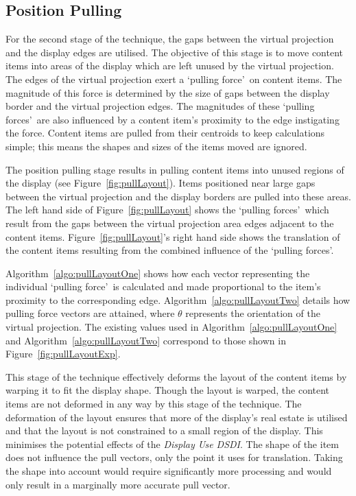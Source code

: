 \documentclass{bmcart}
\begin{document}
\subsection*{Position Pulling}
\label{subsec:positionpulling} 


For the second stage of the technique, the gaps between the virtual projection and the display edges are utilised.
The objective of this stage is to move content items into areas of the display which are left unused by the virtual projection.
The edges of the virtual projection exert a \lq pulling force\rq\ on content items.
The magnitude of this force is determined by the size of gaps between the display border and the virtual projection edges.
The magnitudes of these \lq pulling forces\rq\ are also influenced by a content item's proximity to the edge instigating the force.
Content items are pulled from their centroids to keep calculations simple; this means the shapes and sizes of the items moved are ignored.

The position pulling stage results in pulling content items into unused regions of the display (see
Figure~\ref{fig:pullLayout}).
Items positioned near large gaps between the virtual projection and the display borders are pulled into these areas.
The left hand side of Figure~\ref{fig:pullLayout} shows the \lq pulling forces\rq\ which result from the gaps between the virtual projection area edges adjacent to the content items.
Figure~\ref{fig:pullLayout}'s right hand side shows the translation of the content items resulting from the combined influence of the \lq pulling forces\rq .




Algorithm~\ref{algo:pullLayoutOne} shows how each vector representing the individual \lq pulling force\rq\ is calculated and made proportional to the item's proximity to the corresponding edge.
Algorithm~\ref{algo:pullLayoutTwo} details how pulling force vectors are attained, where $\theta$ represents the orientation of the virtual projection.
The existing values used in Algorithm~\ref{algo:pullLayoutOne} and Algorithm~\ref{algo:pullLayoutTwo} correspond to those shown in Figure~\ref{fig:pullLayoutExp}.

This stage of the technique effectively deforms the layout of the content items by warping it to fit the display shape.
Though the layout is warped, the content items are not deformed in any way by this stage of the technique.
The deformation of the layout ensures that more of the display's real estate is utilised and that the layout is not constrained to a small region of the display.
This minimises the potential effects of the {\emph{Display Use \ac{DSDI}}}.
The shape of the item does not influence the pull vectors, only the point it uses for translation.
Taking the shape into account would require significantly more processing and would only result in a marginally more accurate pull vector.
\end{document}
